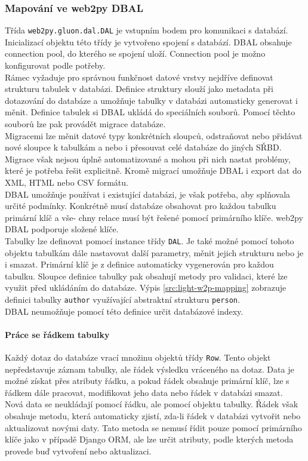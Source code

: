 \documentclass[ing,male,java,dept456]{diploma}						%
\begin{document}
\subsubsection{Mapování ve web2py DBAL}
Třída \lstinline[style=inlinepython]|web2py.gluon.dal.DAL| je vstupním bodem pro komunikaci s databází. Inicializací objektu této třídy je vytvořeno spojení s databází. DBAL obsahuje connection pool, do kterého se spojení uloží. Connection pool je možno konfigurovat podle potřeby. \\
Rámec vyžaduje pro správnou funkčnost datové vrstvy nejdříve definovat strukturu tabulek v databázi. Definice struktury slouží jako metadata při dotazování do databáze a umožňuje tabulky v databázi automaticky generovat i měnit. Definice tabulek si DBAL ukládá do speciálních souborů. Pomocí těchto souborů lze pak provádět migrace databáze. \\
Migracemi lze měnit datové typy konkrétních sloupců, odstraňovat nebo přidávat nové sloupce k tabulkám a nebo i přesouvat celé databáze do jiných SŘBD. Migrace však nejsou úplně automatizované a mohou při nich nastat problémy, které je potřeba řešit explicitně. Kromě migrací umožňuje DBAL i export dat do XML, HTML nebo CSV formátu. \\
DBAL umožňuje používat i existující databázi, je však potřeba, aby splňovala určité podmínky. Konkrétně musí databáze obsahovat pro každou tabulku primární klíč a vše- chny relace musí být řešené pomocí primárního klíče. web2py DBAL podporuje složené klíče. \\
Tabulky lze definovat pomocí instance třídy \lstinline[style=inlinepython]|DAL|. Je také možné pomocí tohoto objektu tabulkám dále nastavovat další parametry, měnit jejich strukturu nebo je i smazat. Primární klíč je z definice automaticky vygenerován pro každou tabulku. Sloupce definice tabulky pak obsahují metody pro validaci, které lze využit před ukládáním do databáze. Výpis \ref{src:light-w2p-mapping} zobrazuje definici tabulky \lstinline[style=inlinepython]|author| využívající abstraktní strukturu \lstinline[style=inlinepython]|person|. \\
DBAL neumožňuje pomocí této definice určit databázové indexy.

\paragraph{Práce se řádkem tabulky}
\label{par:Row}
Každý dotaz do databáze vrací množinu objektů třídy \lstinline[style=inlinepython]|Row|. Tento objekt nepředstavuje záznam tabulky, ale řádek výsledku vráceného na dotaz. Data je možné získat přes atributy řádku, a pokud řádek obsahuje primární klíč, lze s řádkem dále pracovat, modifikovat jeho data nebo řádek v databázi smazat. \\
Nová data se neukládají pomocí řádku, ale pomocí objektu tabulky. Řádek však obsahuje metodu, která automaticky zjistí, zda-li řádek v databázi vytvořit nebo aktualizovat novými daty. Tato metoda se nemusí řídit pouze pomocí primárního klíče jako v případě Django ORM, ale lze určit atributy, podle kterých metoda provede buď vytvoření nebo aktualizaci.
\end{document}
